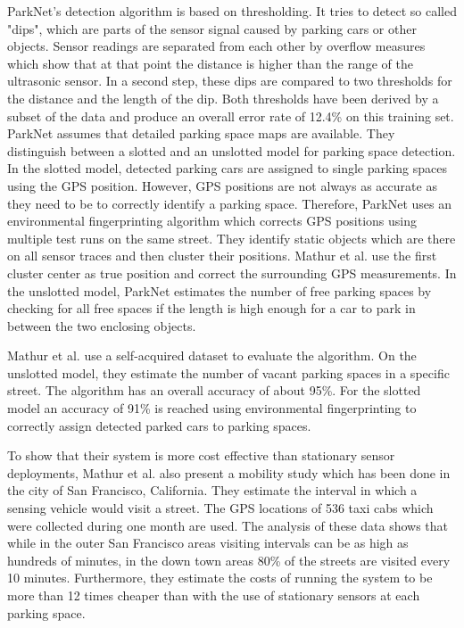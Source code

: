 ParkNet's detection algorithm is based on thresholding. It tries to detect so called "dips", which are parts of the sensor signal caused by parking cars or other objects. Sensor readings are separated from each other by overflow measures which show that at that point the distance is higher than the range of the ultrasonic sensor. In a second step, these dips are compared to two thresholds for the distance and the length of the dip. Both thresholds have been derived by a subset of the data and produce an overall error rate of 12.4\% on this training set. ParkNet assumes that detailed parking space maps are available. They distinguish between a slotted and an unslotted model for parking space detection. In the slotted model, detected parking cars are assigned to single parking spaces using the GPS position. However, GPS positions are not always as accurate as they need to be to correctly identify a parking space. Therefore, ParkNet uses an environmental fingerprinting algorithm which corrects GPS positions using multiple test runs on the same street. They identify static objects which are there on all sensor traces and then cluster their positions. Mathur et al. use the first cluster center as true position and correct the surrounding GPS measurements. In the unslotted model, ParkNet estimates the number of free parking spaces by checking for all free spaces if the length is high enough for a car to park in between the two enclosing objects.

Mathur et al. use a self-acquired dataset to evaluate the algorithm. On the unslotted model, they estimate the number of vacant parking spaces in a specific street. The algorithm has an overall accuracy of about 95\%. For the slotted model an accuracy of 91\% is reached using environmental fingerprinting to correctly assign detected parked cars to parking spaces.

To show that their system is more cost effective than stationary sensor deployments, Mathur et al. also present a mobility study which has been done in the city of San Francisco, California. They estimate the interval in which a sensing vehicle would visit a street. The GPS locations of 536 taxi cabs which were collected during one month are used. The analysis of these data shows that while in the outer San Francisco areas visiting intervals can be as high as hundreds of minutes, in the down town areas 80\% of the streets are visited every 10 minutes. Furthermore, they estimate the costs of running the system to be more than 12 times cheaper than with the use of stationary sensors at each parking space.


